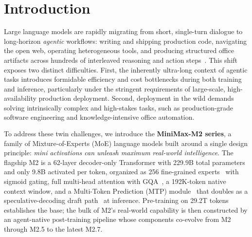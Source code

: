 \section{Introduction}
\label{sec:intro}

Large language models are rapidly migrating from short, single-turn dialogue to long-horizon \emph{agentic} workflows: writing and shipping production code, navigating the open web, operating heterogeneous tools, and producing structured office artifacts across hundreds of interleaved reasoning and action steps~\citep{openai2025gpt5,anthropic2025claude46,google2025gemini31}. This shift exposes two distinct difficulties. First, the inherently ultra-long context of agentic tasks introduces formidable efficiency and cost bottlenecks during both training and inference, particularly under the stringent requirements of large-scale, high-availability production deployment. Second, deployment in the wild demands solving intrinsically complex and high-stakes tasks, such as production-grade software engineering and knowledge-intensive office automation.

To address these twin challenges, we introduce the \textbf{MiniMax-M2 series}, a family of Mixture-of-Experts (MoE) language models built around a single design principle: \emph{mini activations can unleash maximum real-world intelligence}. The flagship M2 is a 62-layer decoder-only Transformer with 229.9B total parameters and only 9.8B activated per token, organized as 256 fine-grained experts~\citep{dai2024deepseekmoe} with sigmoid gating, full multi-head attention with GQA~\citep{ainslie2023gqa}, a 192K-token native context window, and a Multi-Token Prediction (MTP) module~\citep{gloeckle2024better,deepseekai2024v3} that doubles as a speculative-decoding draft path~\citep{leviathan2023fast} at inference. Pre-training on 29.2T tokens establishes the base; the bulk of M2's real-world capability is then constructed by an agent-native post-training pipeline whose components co-evolve from M2 through M2.5 to the latest M2.7.

